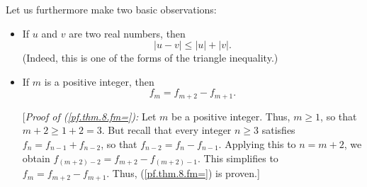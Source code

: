 \documentclass[numbers=enddot,12pt,final,onecolumn,notitlepage]{scrartcl}%
\numberwithin{exer}{section}
\theoremstyle{definition}
\begin{document}
Let us furthermore make two basic observations:

\begin{itemize}
\item If $u$ and $v$ are two real numbers, then
\begin{equation}
\left\vert u-v\right\vert \leq\left\vert u\right\vert +\left\vert v\right\vert
. \label{pf.thm.8.triangle1}%
\end{equation}
(Indeed, this is one of the forms of the triangle inequality.)

\item If $m$ is a positive integer, then
\begin{equation}
f_{m}=f_{m+2}-f_{m+1}. \label{pf.thm.8.fm=}%
\end{equation}


[\textit{Proof of (\ref{pf.thm.8.fm=}):} Let $m$ be a positive integer. Thus,
$m\geq1$, so that $m+2\geq1+2=3$. But recall that every integer $n\geq3$
satisfies $f_{n}=f_{n-1}+f_{n-2}$, so that $f_{n-2}=f_{n}-f_{n-1}$. Applying
this to $n=m+2$, we obtain $f_{\left(  m+2\right)  -2}=f_{m+2}-f_{\left(
m+2\right)  -1}$. This simplifies to $f_{m}=f_{m+2}-f_{m+1}$. Thus,
(\ref{pf.thm.8.fm=}) is proven.]
\end{itemize}
\end{document}
